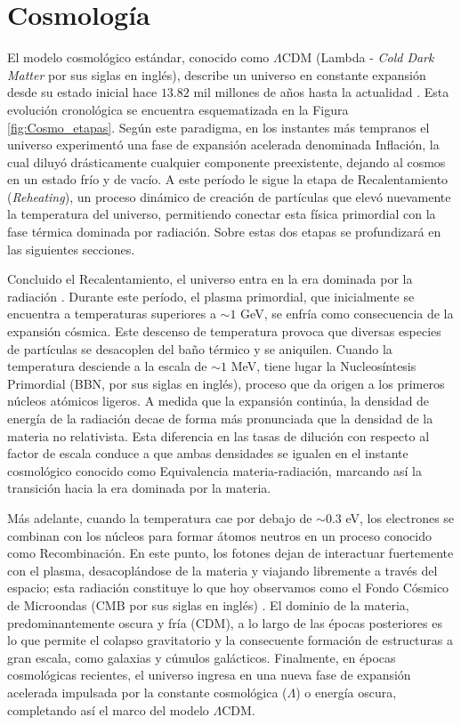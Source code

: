 \chapter{Cosmología} \label{sec:Introduccion}
\setcounter{page}{1}

El modelo cosmológico estándar, conocido como $\Lambda$CDM (Lambda - \textit{Cold Dark Matter} por sus siglas en inglés), describe un universo en constante expansión desde su estado inicial hace $13.82$ mil millones de años hasta la actualidad \cite{Baumann_2012, Weinberg}. Esta evolución cronológica se encuentra esquematizada en la Figura \ref{fig:Cosmo_etapas}. Según este paradigma, en los instantes más tempranos el universo experimentó una fase de expansión acelerada denominada Inflación, la cual diluyó drásticamente cualquier componente preexistente, dejando al cosmos en un estado frío y de vacío. A este período le sigue la etapa de Recalentamiento (\textit{Reheating}), un proceso dinámico de creación de partículas que elevó nuevamente la temperatura del universo, permitiendo conectar esta física primordial con la fase térmica dominada por radiación. Sobre estas dos etapas se profundizará en las siguientes secciones.

Concluido el Recalentamiento, el universo entra en la era dominada por la radiación \cite{Baumann_2012}. Durante este período, el plasma primordial, que inicialmente se encuentra a temperaturas superiores a $\sim 1$ GeV, se enfría como consecuencia de la expansión cósmica. Este descenso de temperatura provoca que diversas especies de partículas se desacoplen del baño térmico y se aniquilen. Cuando la temperatura desciende a la escala de $\sim 1$ MeV, tiene lugar la Nucleosíntesis Primordial (BBN, por sus siglas en inglés), proceso que da origen a los primeros núcleos atómicos ligeros. A medida que la expansión continúa, la densidad de energía de la radiación decae de forma más pronunciada que la densidad de la materia no relativista. Esta diferencia en las tasas de dilución con respecto al factor de escala conduce a que ambas densidades se igualen en el instante cosmológico conocido como Equivalencia materia-radiación, marcando así la transición hacia la era dominada por la materia.

Más adelante, cuando la temperatura cae por debajo de $\sim 0.3$ eV, los electrones se combinan con los núcleos para formar átomos neutros en un proceso conocido como Recombinación. En este punto, los fotones dejan de interactuar fuertemente con el plasma, desacoplándose de la materia y viajando libremente a través del espacio; esta radiación constituye lo que hoy observamos como el Fondo Cósmico de Microondas (CMB por sus siglas en inglés) \cite{Doddelson}. El dominio de la materia, predominantemente oscura y fría (CDM), a lo largo de las épocas posteriores es lo que permite el colapso gravitatorio y la consecuente formación de estructuras a gran escala, como galaxias y cúmulos galácticos. Finalmente, en épocas cosmológicas recientes, el universo ingresa en una nueva fase de expansión acelerada impulsada por la constante cosmológica ($\Lambda$) o energía oscura, completando así el marco del modelo $\Lambda$CDM.

